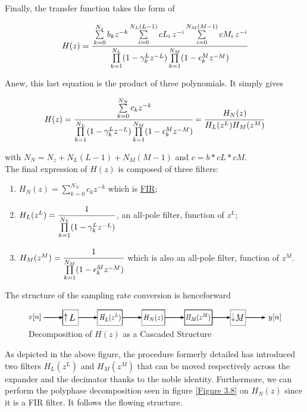 Finally, the transfer function takes the form of 

\begin{align}
	H(z) = \cfrac{\sum\limits_{k=0}^{N_z} b_kz^{-k}\sum\limits_{i=0}^{N_L(L-1)}cL_i\,z^{-i}\sum\limits_{i=0}^{N_M(M-1)}cM_i\,z^{-i}}{\prod\limits_{k=1}^{N_L} (1 - \gamma_k^L z^{-L}) \prod\limits_{k=1}^{N_M} (1 - \epsilon_k^M z^{-M})}
\end{align}

Anew, this last equation is the product of three polynomials. It simply gives 

\begin{align}
H(z) = \cfrac{\sum\limits_{k=0}^{N_N} c_kz^{-k}}{\prod\limits_{k=1}^{N_L} (1 - \gamma_k^L z^{-L}) \prod\limits_{k=1}^{N_M} (1 - \epsilon_k^M z^{-M})} = \cfrac{H_N(z)}{H_L(z^L)H_M(z^M)}\label{eqn:3.22}
\end{align}

with $N_N = N_z + N_L(L-1) + N_M(M-1)$ and $c = b*cL*cM$. \\


The final expression of $H(z)$ is composed of three filters: 

\begin{enumerate}
	\item $H_N(z) = \sum\limits_{k=0}^{N_N} c_kz^{-k}$ which is \hyperlink{FIR}{FIR};
	\item $H_L(z^L)  = \cfrac{1}{\prod\limits_{k=1}^{N_L} (1 - \gamma_k^L z^{-L})}$, an all-pole filter, function of $z^L$;
	\item $H_M(z^M) = \cfrac{1}{\prod\limits_{k=1}^{N_M} (1 - \epsilon_k^M z^{-M})}$ which is also an all-pole filter, function of $z^M$.
\end{enumerate}


The structure of the sampling rate conversion is henceforward

\begin{figure}[ht!]
	\centering
	\hspace*{-5mm}
	\includegraphics[scale = 0.8]{russell.pdf}
	\caption{Decomposition of $H(z)$ as a Cascaded Structure}
	\label{Figure 3.10}
\end{figure}

As depicted in the above figure, the procedure formerly detailed has introduced two filters $H_L(z^L)$ and $H_M(z^M)$ that can be moved respectively across the expander and the decimator thanks to the noble identity. Furthermore, we can perform the polyphase decomposition seen in figure \ref{Figure 3.8} on $H_N(z)$ since it is a FIR filter. It follows the flowing structure.

